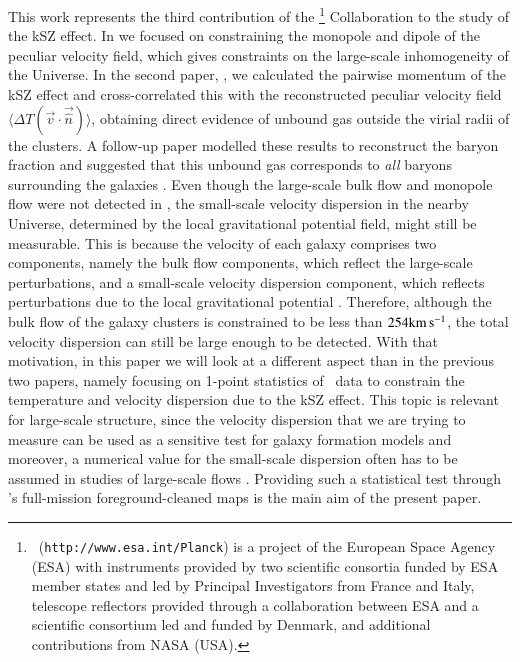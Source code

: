 \documentclass[traditabstract, longauth]{aa}
\newcommand{\1}{\'\i }
\def \kms{{\rm km\,s^{-1}}}
\begin{document}
This work represents the third contribution of the \Planck\footnote{\Planck\
({\tt http://www.esa.int/Planck}) is a project of the European Space Agency
(ESA) with instruments provided by two scientific consortia funded by ESA
member states and led by Principal Investigators from France and Italy,
telescope reflectors provided through a collaboration between ESA and a
scientific consortium led and funded by Denmark, and additional contributions
from NASA (USA).} Collaboration to the study of the kSZ effect. In
\citet{planck2013-XIII} we focused on constraining the monopole and dipole of
the peculiar velocity field, which gives constraints on the large-scale
inhomogeneity of the Universe. In the second paper, \citet{planck2015-XXXVII},
we calculated the pairwise momentum of the kSZ effect and cross-correlated this
with the reconstructed peculiar velocity field $\langle \Delta T
(\vec{v}\cdot\vec{\hat{n}}) \rangle$, obtaining direct evidence of unbound gas
outside the virial radii of the clusters. A follow-up paper modelled these
results to reconstruct the baryon fraction and suggested that this unbound gas
corresponds to {\it all\/} baryons surrounding the galaxies \citep{chm15}. Even
though the large-scale bulk flow and monopole flow were not detected
in \cite{planck2013-XIII}, the small-scale velocity dispersion in the nearby
Universe, determined by the local gravitational potential field, might still be
measurable.
This is because the velocity of each galaxy comprises two components,
namely the bulk flow components, which reflect the large-scale perturbations,
and a small-scale velocity dispersion component, which reflects perturbations
due to the local gravitational potential \citep[see, e.g.,][]{watkinsetal09,
feldmanetal10, mascott12, mascott14}. Therefore, although the bulk flow of the
galaxy clusters is constrained to be less than $254\kms$, the total velocity
dispersion can still be large enough to be detected. With that motivation, in
this paper we will look at a different aspect than in the previous two papers,
namely focusing on 1-point statistics of \Planck\ data to constrain the
temperature and velocity dispersion due to the kSZ effect. This topic is
relevant for large-scale structure, since the velocity dispersion that
we are trying to measure can be used as a sensitive test for galaxy formation
models \citep{Ostriker80, Davies83, Kormendy96, Kormendy01, MacMillan06} and
moreover, a numerical value for the small-scale dispersion often has to be
assumed in studies of large-scale flows \citep[e.g.,][]{Ma-Gordon11,Turnbull12}.
Providing such a statistical test through \Planck's full-mission
foreground-cleaned maps is the main aim of the present paper.
\end{document}
